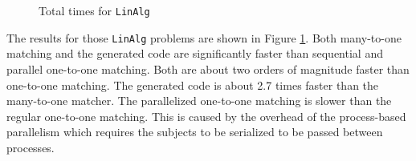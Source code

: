 \documentclass[conference,compsoc]{IEEEtran}
\begin{document}

\begin{figure}[h]
    \centering
    \vspace{-\baselineskip}
    \caption{Total times for \texttt{LinAlg}}\label{fig:linnea-times}
\end{figure}

The results for those \texttt{LinAlg} problems are shown in Figure \ref{fig:linnea-times}.
Both many-to-one matching and the generated code are significantly faster than sequential and parallel one-to-one matching.
Both are about two orders of magnitude faster than one-to-one matching.
The generated code is about 2.7 times faster than the many-to-one matcher.
The parallelized one-to-one matching is slower than the regular one-to-one matching.
This is caused by the overhead of the process-based parallelism which requires the subjects to be serialized to be passed between processes.

\end{document}

